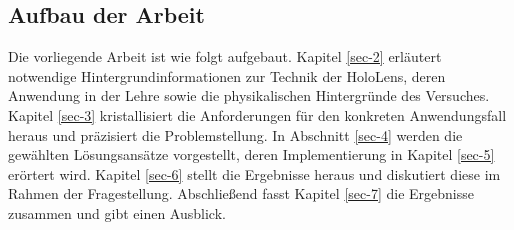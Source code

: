 \begin{comment}
\subsection{Aufgabenstellung}

Im Rahmen der Arbeit soll anhand der HoloLens untersucht werden, wie diese in der Physik-Lehre eingesetzt werden kann, um physikalische Inhalte zu vermitteln. Insbesondere soll betrachtet werden, wie physikalische Experimente mittels Mixed Reality Anwendungen durch zusätzliche Inhalte angereichert werden können.\\

\par
Dazu sind zunächst die technischen Möglichkeiten und Voraussetzungen der HoloLens zu betrachten und in Zusammenhang mit dem Anwendungsfall zu bringen. Weiterhin sind bestehende Ansätze im Einsatz von Mixed Reality Technologie in der Lehre, besonders in der Physik-Lehre, herauszuarbeiten und einzuordnen.

Davon ausgehend soll der Fragestellung anhand eines konkreten Beispiels nachgegangen werden. Für einen ausgewählten Versuchsaufbau sind die darzustellenden Objekte und Informationen sowie das Zusammenspiel dieser mit dem aufgebauten Experiment, der Umgebung und den Nutzern zu entwickeln. Für den ausgewählten Anwendungsfall soll eine Umsetzung mit der HoloLens konzipiert, designet und prototypisch implementiert werden.
\end{comment}

\subsection{Aufbau der Arbeit}
\label{sec-1-3}
Die vorliegende Arbeit ist wie folgt aufgebaut. Kapitel \ref{sec-2} erläutert notwendige Hintergrundinformationen zur Technik der HoloLens, deren Anwendung in der Lehre sowie die physikalischen Hintergründe des Versuches. Kapitel \ref{sec-3} kristallisiert die Anforderungen für den konkreten Anwendungsfall heraus und präzisiert die Problemstellung. In Abschnitt \ref{sec-4} werden die gewählten Lösungsansätze vorgestellt, deren Implementierung in Kapitel \ref{sec-5} erörtert wird. Kapitel \ref{sec-6} stellt die Ergebnisse heraus und diskutiert diese im Rahmen der Fragestellung. Abschließend fasst Kapitel \ref{sec-7} die Ergebnisse zusammen und gibt einen Ausblick.